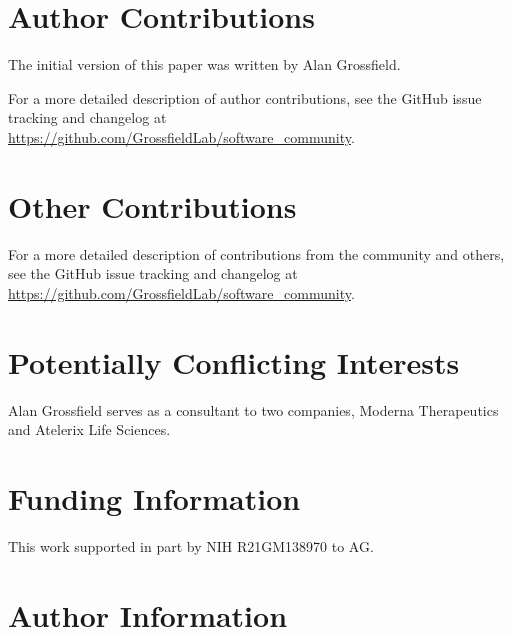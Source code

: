 \documentclass[9pt,training]{livecoms}
\newcommand{\githubrepository}{\url{https://github.com/GrossfieldLab/software_community}}
\begin{document}
\section{Author Contributions}
%
The initial version of this paper was written by Alan Grossfield.


For a more detailed description of author contributions,
see the GitHub issue tracking and changelog at \githubrepository.

\section{Other Contributions}
%


For a more detailed description of contributions from the community and others, see the GitHub issue tracking and changelog at \githubrepository.

\section{Potentially Conflicting Interests}

Alan Grossfield serves as a consultant to two companies, Moderna Therapeutics
and Atelerix Life Sciences.

\section{Funding Information}
This work supported in part by NIH R21GM138970 to AG.

\section*{Author Information}
\makeorcid




\end{document}
